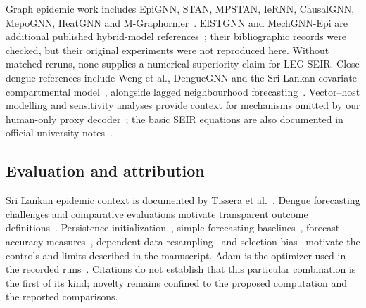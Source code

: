 \documentclass[11pt]{article}
\begin{document}
Graph epidemic work includes EpiGNN, STAN, MPSTAN, IeRNN, CausalGNN, MepoGNN, HeatGNN and M-Graphormer~\cite{epignn2022,stan2020,mpstan2023,iernn2020,causalgnn2022,mepognn2023,heatgnn2024,mgraphormer2025}. EISTGNN and MechGNN-Epi are additional published hybrid-model references~\cite{eistgnn2025,mechgnn2026}; their bibliographic records were checked, but their original experiments were not reproduced here. Without matched reruns, none supplies a numerical superiority claim for LEG-SEIR. Close dengue references include Weng et al., DengueGNN and the Sri Lankan covariate compartmental model~\cite{weng2024graph,gulmohamed2026denguegnn,liu2025seirlstm}, alongside lagged neighbourhood forecasting~\cite{liucao2026}. Vector--host modelling and sensitivity analyses provide context for mechanisms omitted by our human-only proxy decoder~\cite{seirsei2022,phaijoo2018sensitivity}; the basic SEIR equations are also documented in official university notes~\cite{gopalakrishnan2020seir}.

\subsection{Evaluation and attribution}
Sri Lankan epidemic context is documented by Tissera et al.~\cite{tissera2020severe}. Dengue forecasting challenges and comparative evaluations motivate transparent outcome definitions~\cite{johansson2019challenge,johansson2016evaluation}. Persistence initialization~\cite{haugsdal2023persistence}, simple forecasting baselines~\cite{zeng2023nlinear}, forecast-accuracy measures~\cite{hyndman2006accuracy}, dependent-data resampling~\cite{kunsch1989bootstrap} and selection bias~\cite{cawley2010selection} motivate the controls and limits described in the manuscript. Adam is the optimizer used in the recorded runs~\cite{kingma2015adam}. Citations do not establish that this particular combination is the first of its kind; novelty remains confined to the proposed computation and the reported comparisons.



\end{document}
